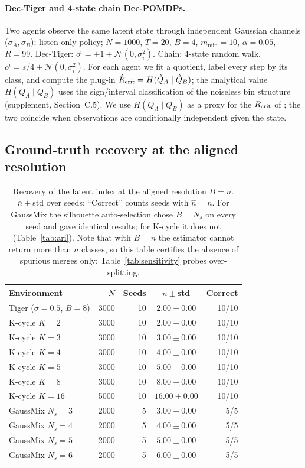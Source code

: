 \documentclass[10pt]{article}
\begin{document}
\paragraph{Dec-Tiger and 4-state chain Dec-POMDPs.}
Two agents observe the same latent state through independent Gaussian
channels ($\sigma_A,\sigma_B$); listen-only policy; $N=1000$, $T=20$, $B=4$,
$m_{\min}=10$, $\alpha=0.05$, $R=99$.  Dec-Tiger: $o^i=\pm1+\mathcal N(0,\sigma_i^2)$.
Chain: 4-state random walk, $o^i=s/4+\mathcal N(0,\sigma_i^2)$.  For each
agent we fit a quotient, label every step by its class, and compute the plug-in
$\hat R_{\rm crit}=H(\hat Q_A\mid\hat Q_B)$; the analytical value
$H(Q_A\mid Q_B)$ uses the sign/interval classification of the noiseless bin
structure (supplement, Section~C.5).  We use $H(Q_A\mid Q_B)$ as a proxy for
the $R_{\rm crit}$ of \citet{nixon2026rcrit}; the two coincide when
observations are conditionally independent given the state.

\subsection{Ground-truth recovery at the aligned resolution}

\begin{table}[t]
\centering
\caption{Recovery of the latent index at the aligned resolution $B=n$.
  $\bar n\pm$std over seeds; ``Correct'' counts seeds with $\hat n=n$.
  For GaussMix the silhouette auto-selection chose $B=N_s$ on every seed and
  gave identical results; for K-cycle it does not (Table~\ref{tab:ari}).  Note that with $B=n$ the estimator cannot return
  more than $n$ classes, so this table certifies the absence of spurious
  merges only; Table~\ref{tab:sensitivity} probes over-splitting.}
\label{tab:layer1}
\begin{tabular}{lrrcr}
\toprule
Environment & $N$ & Seeds & $\bar n\pm$std & Correct \\
\midrule
Tiger ($\sigma{=}0.5$, $B{=}8$) & 3000 & 10 & $2.00\pm0.00$ & 10/10 \\
K-cycle $K{=}2$   & 3000 & 10 & $2.00\pm0.00$  & 10/10 \\
K-cycle $K{=}3$   & 3000 & 10 & $3.00\pm0.00$  & 10/10 \\
K-cycle $K{=}4$   & 3000 & 10 & $4.00\pm0.00$  & 10/10 \\
K-cycle $K{=}5$   & 3000 & 10 & $5.00\pm0.00$  & 10/10 \\
K-cycle $K{=}8$   & 3000 & 10 & $8.00\pm0.00$  & 10/10 \\
K-cycle $K{=}16$  & 5000 & 10 & $16.00\pm0.00$ & 10/10 \\
GaussMix $N_s{=}3$ & 2000 & 5 & $3.00\pm0.00$ & 5/5 \\
GaussMix $N_s{=}4$ & 2000 & 5 & $4.00\pm0.00$ & 5/5 \\
GaussMix $N_s{=}5$ & 2000 & 5 & $5.00\pm0.00$ & 5/5 \\
GaussMix $N_s{=}6$ & 2000 & 5 & $6.00\pm0.00$ & 5/5 \\
\bottomrule
\end{tabular}
\end{table}
\end{document}
